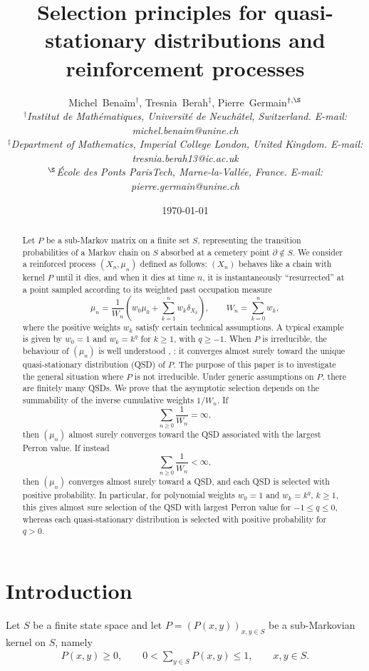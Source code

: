 \documentclass[10pt,letterpaper]{article}
\title{Selection principles for quasi-stationary distributions and reinforcement processes}
\author{
Michel~Bena\"im$^{\dagger}$,
Tresnia~Berah$^{\ddagger}$,
Pierre~Germain$^{\dagger,\S}$
\\[0.3cm]
{\small \textit{$^{\dagger}$Institut de Mathématiques, Université de Neuchâtel, Switzerland. E-mail: michel.benaim@unine.ch}}
\\
{\small \textit{$^{\ddagger}$Department of Mathematics, Imperial College London, United Kingdom. E-mail: tresnia.berah13@ic.ac.uk}}
\\
{\small \textit{$^{\S}$École des Ponts ParisTech, Marne-la-Vallée, France. E-mail: pierre.germain@unine.ch}}
}
\date{\today}
\theoremstyle{compactplain}
\theoremstyle{compactdefinition}
\newcommand{\1}{\mathds{1}}
\begin{document}
\maketitle


\begin{abstract}

Let $P$ be a sub-Markov matrix on a finite set $S$, representing the
transition probabilities of a Markov chain on \(S\) absorbed at a cemetery
point $\partial\notin S$. We consider a reinforced process
\((X_n,\mu_n)\) defined as follows: $(X_n)$ behaves like a chain with kernel $P$ 
until it dies, and when it dies at time $n$, it is instantaneously
``resurrected'' at a point sampled according to its weighted past occupation
measure
$$
\mu_n
=
\frac{1}{W_n}
\left(
w_0\mu_0+\sum_{k=1}^n w_k\delta_{X_k}
\right),
\qquad
W_n=\sum_{k=0}^n w_k,
$$
where the positive weights $w_k$ satisfy certain technical assumptions. A typical example is given by $w_0=1$ and $w_k=k^q$ for $k\geq1$, with $q\geq-1$.
When $P$ is irreducible, the behaviour of $(\mu_n)$ is well understood \cite{AFP}, \cite{bansaye2022non}: it converges almost surely toward the
unique quasi-stationary distribution (QSD) of $P$. The purpose of this paper is to investigate the general situation where $P$ is not irreducible. Under
generic assumptions on $P$, there are finitely many QSDs. We prove that the asymptotic selection depends on the summability of the inverse cumulative weights $1/W_n$. If
$$
\sum_{n\geq 0}\frac1{W_n}=\infty,
$$
then $(\mu_n)$ almost surely converges toward the QSD associated with the largest Perron value. If instead
$$
\sum_{n\geq0}\frac1{W_n}<\infty,
$$
then $(\mu_n)$ converges almost surely toward a QSD, and each QSD is selected with positive probability. In particular, for polynomial weights $w_0=1$ and $w_k=k^q$, $k\geq1$, this gives almost
sure selection of the QSD with largest Perron value for $-1\leq q\leq 0$, whereas each quasi-stationary distribution is selected with positive probability for $q>0$.
\end{abstract}





\section{Introduction}

Let \(S\) be a finite state space and let \(P=(P(x,y))_{x,y\in S}\) be a sub-Markovian kernel on \(S\), namely
\begin{align}\label{def:sub-markov-matrix}
    P(x,y)\geq0,
\qquad
0<\sum_{y\in S}P(x,y)\leq1,
\qquad x,y\in S.
\end{align}
\end{document}
